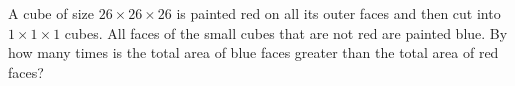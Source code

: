A cube of size $26\times26\times26$ is painted red on all its outer faces and then cut into $1\times1\times1$ cubes. All faces of the small cubes that are not red are painted blue. By how many times is the total area of blue faces greater than the total area of red faces?
